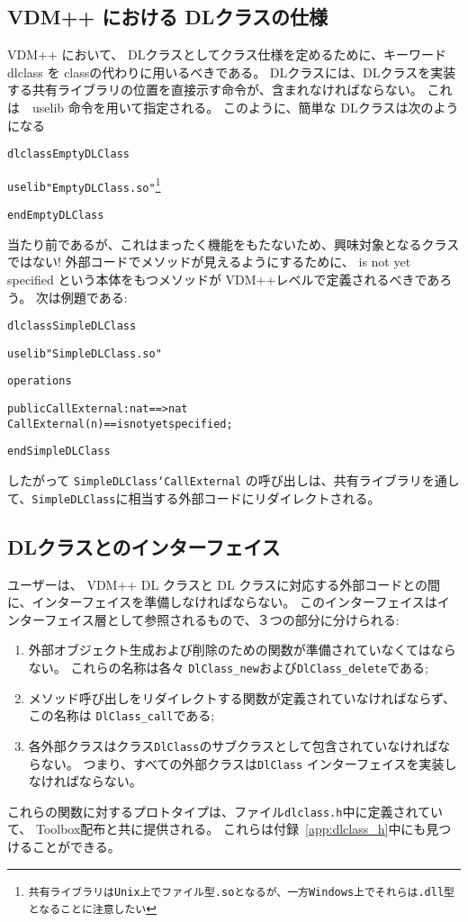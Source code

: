 \documentclass[\pformat,12pt]{jarticle}
\begin{document}
\subsection{VDM++ における DLクラスの仕様}

VDM++ において、 DLクラスとしてクラス仕様を定めるために、キーワード\textsf{dlclass} を \textsf{class}の代わりに用いるべきである。
DLクラスには、DLクラスを実装する共有ライブラリの位置を直接示す命令が、含まれなければならない。 
これは　\textsf{uselib} 命令を用いて指定される。 
このように、簡単な DLクラスは次のようになる

\begin{alltt}
\textsf{dlclass} EmptyDLClass

\textsf{uselib} "EmptyDLClass.so"\footnote{共有ライブラリは Unix 上でファイル型\texttt{.so}となるが、一方 Windows 上でそれらは \texttt{.dll}型となることに注意したい} 

\textsf{end} EmptyDLClass
\end{alltt}

当たり前であるが、これはまったく機能をもたないため、興味対象となるクラスではない! 
外部コードでメソッドが見えるようにするために、 \textsf{is not yet specified} という本体をもつメソッドが VDM++レベルで定義されるべきであろう。
次は例題である:

\begin{alltt}
\textsf{dlclass} SimpleDLClass

\textsf{uselib} "SimpleDLClass.so"

\textsf{operations}

\textsf{public} CallExternal : nat ==> nat
CallExternal (n) == \textsf{is not yet specified};

\textsf{end} SimpleDLClass
\end{alltt}
したがって \texttt{SimpleDLClass`CallExternal} の呼び出しは、共有ライブラリを通して、\texttt{SimpleDLClass}に相当する外部コードにリダイレクトされる。

\subsection{DLクラスとのインターフェイス}

ユーザーは、 VDM++ DL クラスと DL クラスに対応する外部コードとの間に、インターフェイスを準備しなければならない。
このインターフェイスはインターフェイス層として参照されるもので、３つの部分に分けられる:
\begin{enumerate}
\item 外部オブジェクト生成および削除のための関数が準備されていなくてはならない。
これらの名称は各々 \texttt{DlClass\_new}および\texttt{DlClass\_delete}である; 
\item メソッド呼び出しをリダイレクトする関数が定義されていなければならず、この名称は \texttt{DlClass\_call}である;
\item 各外部クラスはクラス\texttt{DlClass}のサブクラスとして包含されていなければならない。 
つまり、すべての外部クラスは\texttt{DlClass} インターフェイスを実装しなければならない。
\end{enumerate}
これらの関数に対するプロトタイプは、ファイル\texttt{dlclass.h}中に定義されていて、 Toolbox配布と共に提供される。
これらは付録~\ref{app:dlclass_h}中にも見つけることができる。 
\end{document}
